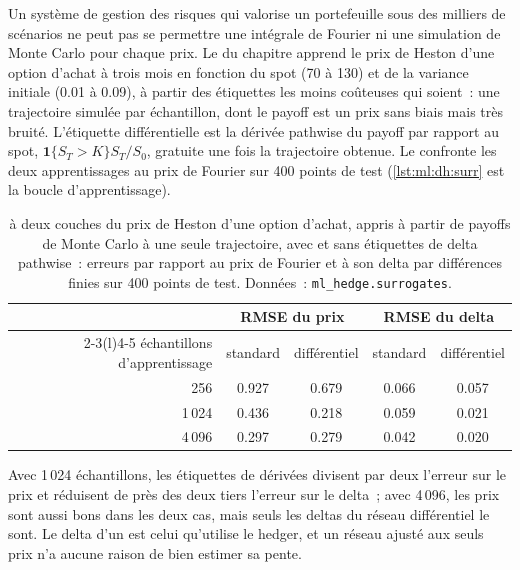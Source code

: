 Un système de gestion des risques qui valorise un portefeuille sous des milliers de scénarios ne peut pas se permettre une intégrale de Fourier ni une simulation de Monte Carlo pour chaque
prix. Le  du chapitre apprend le prix de Heston d'une option d'achat à trois mois en fonction du spot (70 à 130) et de la
variance initiale (0.01 à 0.09), à partir des étiquettes les moins coûteuses qui soient~: une trajectoire simulée par échantillon, dont le payoff est un prix sans biais
mais très bruité. L'étiquette différentielle est la dérivée pathwise du payoff par rapport au spot,
$\mathbf1\{S_T > K\}S_T/S_0$, gratuite une fois la trajectoire obtenue. Le  confronte les deux apprentissages au prix de Fourier
sur 400 points de test (\cref{lst:ml:dh:surr} est la boucle d'apprentissage).

\begin{table}[htbp]
\centering\small
\begin{tabular}{@{}rcccc@{}}
\toprule
& \multicolumn{2}{c}{RMSE du prix} & \multicolumn{2}{c}{RMSE du delta}\\
\cmidrule(lr){2-3}\cmidrule(l){4-5}
échantillons d'apprentissage & standard & différentiel & standard & différentiel\\
\midrule
256 & 0.927 & 0.679 & 0.066 & 0.057\\
1\,024 & 0.436 & 0.218 & 0.059 & 0.021\\
4\,096 & 0.297 & 0.279 & 0.042 & 0.020\\
\bottomrule
\end{tabular}
\caption{ à deux couches du prix de Heston d'une option d'achat, appris à partir de payoffs de Monte Carlo à une seule trajectoire, avec et sans
étiquettes de delta pathwise~: erreurs par rapport au prix de Fourier et à son delta par différences finies sur 400 points de test. Données~:
\texttt{ml\_hedge.surrogates}.}\label{tab:ml:dh:surr}
\end{table}

Avec 1\,024 échantillons, les étiquettes de dérivées divisent par deux l'erreur sur le prix et réduisent de près des deux tiers l'erreur sur le delta~; avec 4\,096, les
prix sont aussi bons dans les deux cas, mais seuls les deltas du réseau différentiel le sont. Le delta d'un  est celui qu'utilise le hedger, et
un réseau ajusté aux seuls prix n'a aucune raison de bien estimer sa pente.

